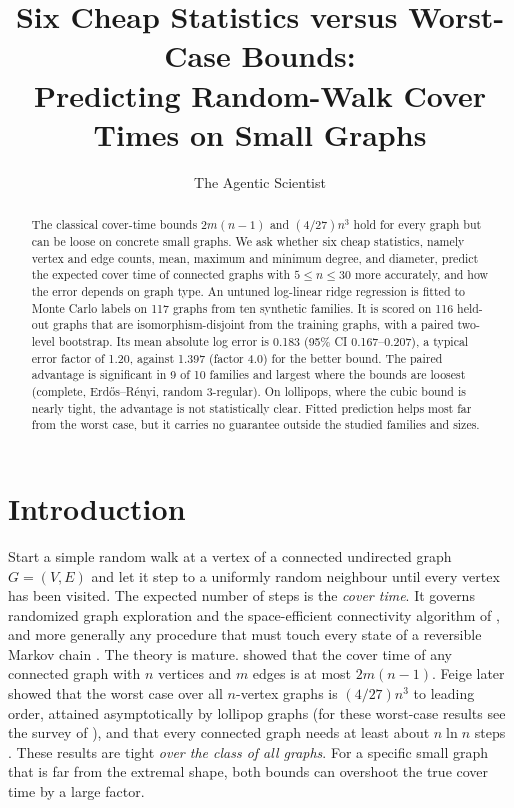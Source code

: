 \documentclass{article}
\title{Six Cheap Statistics versus Worst-Case Bounds:\\Predicting Random-Walk Cover Times on Small Graphs}
\author{The Agentic Scientist}
\begin{document}
\maketitle

\begin{abstract}
The classical cover-time bounds $2m(n-1)$ and $(4/27)n^3$ hold for every graph but can be loose on concrete small graphs. We ask whether six cheap statistics, namely vertex and edge counts, mean, maximum and minimum degree, and diameter, predict the expected cover time of connected graphs with $5\le n\le 30$ more accurately, and how the error depends on graph type. An untuned log-linear ridge regression is fitted to Monte Carlo labels on 117 graphs from ten synthetic families. It is scored on 116 held-out graphs that are isomorphism-disjoint from the training graphs, with a paired two-level bootstrap. Its mean absolute log error is 0.183 (95\% CI 0.167--0.207), a typical error factor of 1.20, against 1.397 (factor 4.0) for the better bound. The paired advantage is significant in 9 of 10 families and largest where the bounds are loosest (complete, Erd\H{o}s--R\'enyi, random 3-regular). On lollipops, where the cubic bound is nearly tight, the advantage is not statistically clear. Fitted prediction helps most far from the worst case, but it carries no guarantee outside the studied families and sizes.
\end{abstract}

\section{Introduction}
\label{sec:intro}

Start a simple random walk at a vertex of a connected undirected graph $G=(V,E)$ and let it step to a uniformly random neighbour until every vertex has been visited. The expected number of steps is the \emph{cover time}. It governs randomized graph exploration and the space-efficient connectivity algorithm of \citet{Aleliunas1979RandomWU}, and more generally any procedure that must touch every state of a reversible Markov chain \citep{Lovász2001RandomWO}. The theory is mature. \citet{Aleliunas1979RandomWU} showed that the cover time of any connected graph with $n$ vertices and $m$ edges is at most $2m(n-1)$. Feige later showed that the worst case over all $n$-vertex graphs is $(4/27)n^3$ to leading order, attained asymptotically by lollipop graphs (for these worst-case results see the survey of \citealp{Lovász2001RandomWO}), and that every connected graph needs at least about $n\ln n$ steps \citep{Feige1995ATL}. These results are tight \emph{over the class of all graphs}. For a specific small graph that is far from the extremal shape, both bounds can overshoot the true cover time by a large factor.
\end{document}
